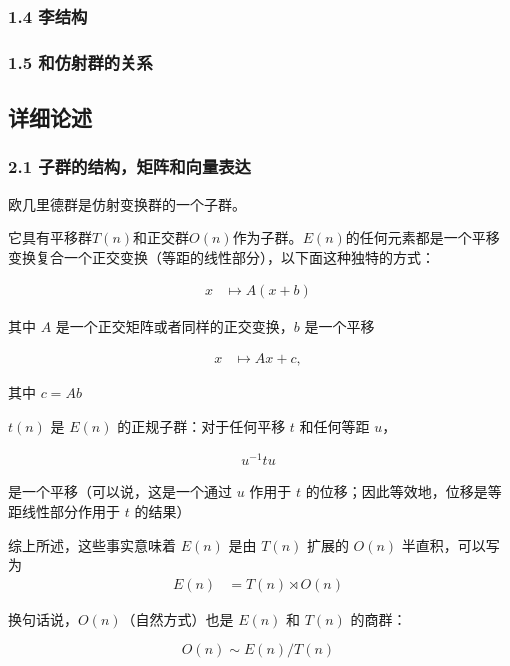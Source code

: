 \subsubsection{1.4 李结构}



\subsubsection{1.5 和仿射群的关系}



\subsection{详细论述}



\subsubsection{2.1 子群的结构，矩阵和向量表达}

欧几里德群是仿射变换群的一个子群。

它具有平移群$T(n)$和正交群$O(n)$作为子群。$E(n)$的任何元素都是一个平移变换复合一个正交变换（等距的线性部分），以下面这种独特的方式：

\begin{align}
x & \mapsto A(x + b)~
\end{align}

其中 $A$ 是一个正交矩阵或者同样的正交变换，$b$ 是一个平移

\begin{align}
x & \mapsto Ax + c,~
\end{align}

其中 $c = Ab$

$t(n)$ 是 $E(n)$ 的正规子群：对于任何平移 $t$ 和任何等距 $u$，

\begin{align}
u^{-1} tu~
\end{align}

是一个平移（可以说，这是一个通过 $u$ 作用于 $t$ 的位移；因此等效地，位移是等距线性部分作用于 $t$ 的结果）

综上所述，这些事实意味着 $E(n)$ 是由 $T(n)$ 扩展的 $O(n)$ 半直积，可以写为
\begin{align}
E(n) &= T(n) \rtimes O(n)~
\end{align}

换句话说，$O(n)$（自然方式）也是 $E(n)$ 和 $T(n)$ 的商群：

\begin{equation}
O(n) \sim E(n)/T(n)~
\end{equation}

